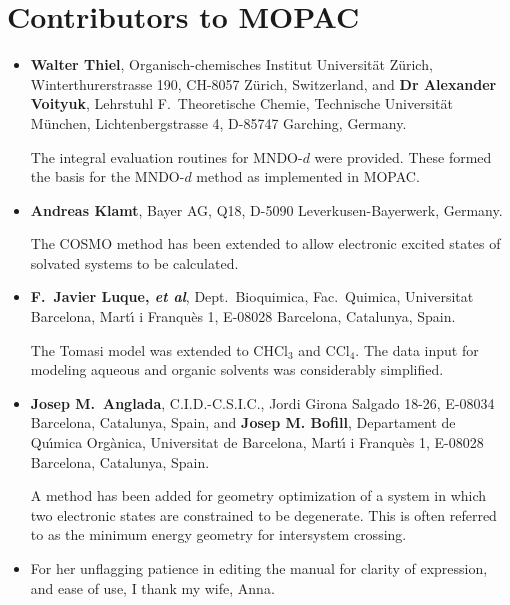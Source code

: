 \section{Contributors to MOPAC}
\begin{itemize}
\item{\bf Walter Thiel}, Organisch-chemisches Institut
Universit\"{a}t Z\"{u}rich,
Winterthurerstrasse 190,
CH-8057 Z\"{u}rich,
Switzerland, and {\bf Dr Alexander Voityuk},
Lehrstuhl F.\ Theoretische Chemie,
Technische Universit\"{a}t M\"{u}nchen,
Lichtenbergstrasse 4,
D-85747 Garching,
Germany.

The integral evaluation routines for MNDO-$d$ were provided.  These formed the
basis for the MNDO-$d$ method as implemented in MOPAC.


\item {\bf Andreas Klamt}, Bayer AG, Q18, D-5090
Leverkusen-Bayerwerk, Germany.

The COSMO method has been extended to allow electronic excited states of
solvated systems to be calculated.

\item {\bf F.\ Javier Luque, {\em et al}}, Dept.\ Bioquimica, Fac.\ Quimica,
Universitat Barcelona,
Mart\'{\i} i  Franqu\`{e}s 1,
E-08028 Barcelona, Catalunya, Spain.

The Tomasi model was extended to CHCl$_3$ and CCl$_4$.  The data input for
modeling aqueous and organic solvents was considerably simplified.

\item {\bf Josep M.\ Anglada}, C.I.D.-C.S.I.C., Jordi Girona Salgado  18-26,
E-08034 Barcelona, Catalunya, Spain, and {\bf Josep M. Bofill}, Departament de
Qu\'{\i}mica Org\`{a}nica, Universitat de Barcelona, Mart\'{\i} i  Franqu\`{e}s
1, E-08028 Barcelona, Catalunya, Spain.

A method has been added for geometry optimization of a system in which  two
electronic states are constrained to  be degenerate.  This is often referred to
as the minimum energy geometry for intersystem crossing.


\item For her unflagging patience in editing  the manual for clarity
of  expression, and ease of use, I thank my wife, Anna.
\end{itemize}
